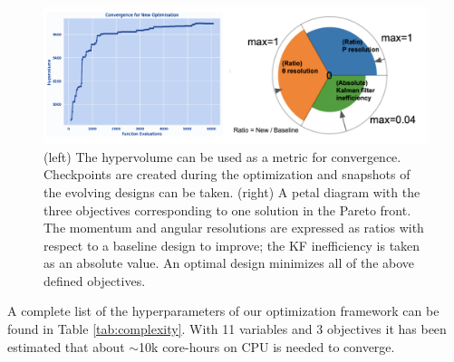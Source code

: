 \begin{figure}[!]
    \centering
    \includegraphics[scale = 0.35]{figs/convergence.png}
    \caption{(left) The hypervolume can be used as a metric for convergence. Checkpoints are created during the optimization and snapshots of the evolving designs can be taken. (right) A petal diagram with the three objectives corresponding to one solution in the Pareto front. The momentum and angular resolutions are expressed as ratios with respect to a baseline design to improve; the KF inefficiency is taken as an absolute value. An optimal design minimizes all of the above defined objectives. 
}
    \label{fig:convergence}
\end{figure}

A complete list of the hyperparameters of our optimization framework can be found in Table \ref{tab:complexity}.
With 11 variables and 3 objectives it has been estimated that about $\sim$10k core-hours on CPU is needed to converge. 


